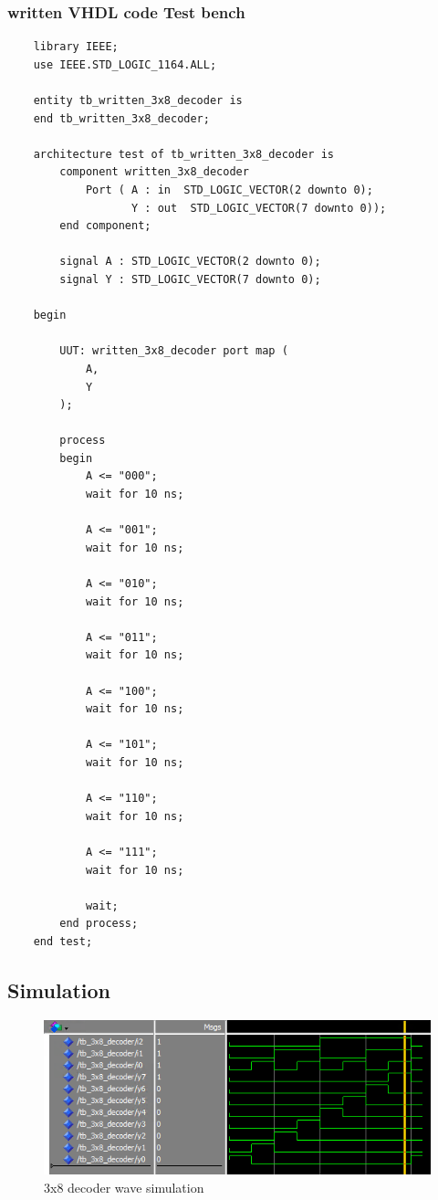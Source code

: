 \documentclass[12pt]{article}
\begin{document}
\subsubsection{written VHDL code Test bench}
\begin{verbatim}
    library IEEE;
    use IEEE.STD_LOGIC_1164.ALL;
    
    entity tb_written_3x8_decoder is
    end tb_written_3x8_decoder;
    
    architecture test of tb_written_3x8_decoder is
        component written_3x8_decoder
            Port ( A : in  STD_LOGIC_VECTOR(2 downto 0);
                   Y : out  STD_LOGIC_VECTOR(7 downto 0));
        end component;
    
        signal A : STD_LOGIC_VECTOR(2 downto 0);
        signal Y : STD_LOGIC_VECTOR(7 downto 0);
    
    begin
    
        UUT: written_3x8_decoder port map (
            A,
            Y
        );
    
        process
        begin
            A <= "000"; 
            wait for 10 ns;
            
            A <= "001";
            wait for 10 ns;
            
            A <= "010"; 
            wait for 10 ns;
            
            A <= "011"; 
            wait for 10 ns;
            
            A <= "100"; 
            wait for 10 ns;
            
            A <= "101"; 
            wait for 10 ns;
            
            A <= "110"; 
            wait for 10 ns;
       
            A <= "111"; 
            wait for 10 ns;
            
            wait;
        end process;
    end test;

\end{verbatim}

\subsection{Simulation}
\begin{figure}[h]
\caption{3x8 decoder wave simulation}
\centering
\includegraphics[width=\textwidth]{./diagrams/3x8_simulation.png}
\end{figure}
\end{document}
